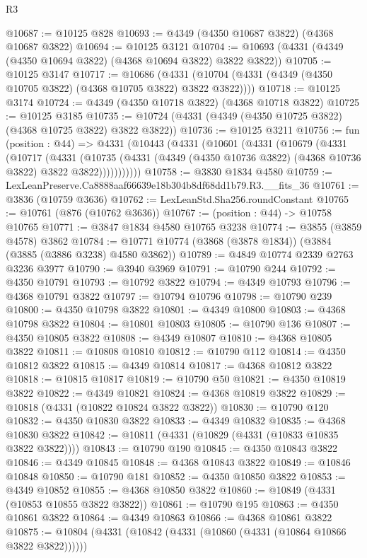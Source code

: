 \begin{lexlean}{R3}
\begin{coremodule}
@10687 := @10125 @828
@10693 := @4349 (@4350 @10687 @3822) (@4368 @10687 @3822)
@10694 := @10125 @3121
@10704 := @10693 (@4331 (@4349 (@4350 @10694 @3822) (@4368 @10694 @3822) @3822 @3822))
@10705 := @10125 @3147
@10717 := @10686
    (@4331 (@10704 (@4331 (@4349 (@4350 @10705 @3822) (@4368 @10705 @3822) @3822 @3822))))
@10718 := @10125 @3174
@10724 := @4349 (@4350 @10718 @3822) (@4368 @10718 @3822)
@10725 := @10125 @3185
@10735 := @10724 (@4331 (@4349 (@4350 @10725 @3822) (@4368 @10725 @3822) @3822 @3822))
@10736 := @10125 @3211
@10756 := fun (position : @44) =>
  @4331
    (@10443
      (@4331
        (@10601
          (@4331
            (@10679
              (@4331
                (@10717
                  (@4331
                    (@10735
                      (@4331 (@4349 (@4350 @10736 @3822) (@4368 @10736 @3822) @3822 @3822)))))))))))
@10758 := @3830 @1834 @4580
@10759 := LexLeanPreserve.Ca8888aaf66639e18b304b8df68dd1b79.R3.__fits_36
@10761 := @3836 (@10759 @3636)
@10762 := LexLeanStd.Sha256.roundConstant
@10765 := @10761 (@876 (@10762 @3636))
@10767 := (position : @44) -> @10758 @10765
@10771 := @3847 @1834 @4580 @10765 @3238
@10774 := @3855 (@3859 @4578) @3862
@10784 := @10771 @10774 (@3868 (@3878 @1834)) (@3884 (@3885 (@3886 @3238) @4580 @3862))
@10789 := @4849 @10774 @2339 @2763 @3236 @3977
@10790 := @3940 @3969
@10791 := @10790 @244
@10792 := @4350 @10791
@10793 := @10792 @3822
@10794 := @4349 @10793
@10796 := @4368 @10791 @3822
@10797 := @10794 @10796
@10798 := @10790 @239
@10800 := @4350 @10798 @3822
@10801 := @4349 @10800
@10803 := @4368 @10798 @3822
@10804 := @10801 @10803
@10805 := @10790 @136
@10807 := @4350 @10805 @3822
@10808 := @4349 @10807
@10810 := @4368 @10805 @3822
@10811 := @10808 @10810
@10812 := @10790 @112
@10814 := @4350 @10812 @3822
@10815 := @4349 @10814
@10817 := @4368 @10812 @3822
@10818 := @10815 @10817
@10819 := @10790 @50
@10821 := @4350 @10819 @3822
@10822 := @4349 @10821
@10824 := @4368 @10819 @3822
@10829 := @10818 (@4331 (@10822 @10824 @3822 @3822))
@10830 := @10790 @120
@10832 := @4350 @10830 @3822
@10833 := @4349 @10832
@10835 := @4368 @10830 @3822
@10842 := @10811 (@4331 (@10829 (@4331 (@10833 @10835 @3822 @3822))))
@10843 := @10790 @190
@10845 := @4350 @10843 @3822
@10846 := @4349 @10845
@10848 := @4368 @10843 @3822
@10849 := @10846 @10848
@10850 := @10790 @181
@10852 := @4350 @10850 @3822
@10853 := @4349 @10852
@10855 := @4368 @10850 @3822
@10860 := @10849 (@4331 (@10853 @10855 @3822 @3822))
@10861 := @10790 @195
@10863 := @4350 @10861 @3822
@10864 := @4349 @10863
@10866 := @4368 @10861 @3822
@10875 := @10804 (@4331 (@10842 (@4331 (@10860 (@4331 (@10864 @10866 @3822 @3822))))))

\end{coremodule}
\end{lexlean}
